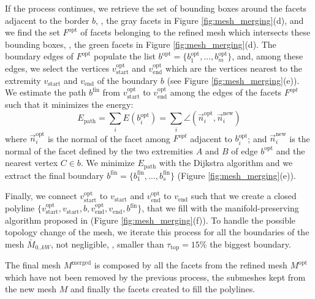 \documentclass[times,10pt,twocolumn]{article}
\begin{document}
If the process continues, we retrieve the set of bounding boxes around the facets adjacent to the border $\mathit{b}$, \ie, the gray facets in Figure \ref{fig:mesh_merging}(d), and we find the set $\mathit{F}^{\text{opt}}$ of facets  belonging to the refined mesh which intersects these bounding boxes, \eg, the green facets  in Figure \ref{fig:mesh_merging}(d).
The boundary edges of $\mathit{F}^{\text{opt}}$ populate the list  $\mathit{b}^{\text{opt}} = \{b_1^{\text{opt}}, \dots,  b_m^{\text{opt}}\}$, and, among these edges, we select the vertices  $v_{\text{start}}^{\text{opt}}$ and $v_{\text{end}}^{\text{opt}}$ which are the vertices nearest to the extremity $v_{\text{start}}$ and  $v_{\text{end}}$ of the boundary $\mathit{b}$ (see Figure \ref{fig:mesh_merging}(e)). 
We estimate the path  $\mathit{b}^{\text{fin}}$ from $v_{\text{start}}^{\text{opt}}$ to $v_{\text{end}}^{\text{opt}}$ among the edges of the facets  $\mathit{F}^{opt}$ such that it minimizes the energy:
\begin{equation}
  E_{\text{path}} = \sum_i E(b_i^{\text{opt}})= \sum_i \angle (\overrightarrow{n}_i^{\text{opt}},\overrightarrow{n}_i^{\text{new}})
\end{equation}
where $\overrightarrow{n}_i^{\text{opt}}$ is the normal of the facet among $\mathit{F}^{opt}$ adjacent to  $b_i^{\text{opt}}$; and
$\overrightarrow{n}_i^{\text{new}}$ is the normal of the facet defined by the two extremities $A$ and $B$ of edge ${b}^{\text{opt}}$ and the nearest vertex $C \in \mathit{b}$.
We minimize $E_{\text{path}}$ with the Dijkstra algorithm  and we extract the final boundary $\mathit{b}^{\text{fin}} = \{ b_1^{\text{fin}}, \dots, b_s^{\text{fin}}\}$ (Figure \ref{fig:mesh_merging}(e)).

Finally, we connect $v_{\text{start}}^{\text{opt}}$ to $v_{\text{start}}$  and $v_{\text{end}}^{\text{opt}}$ to  $v_{\text{end}}$ such that we create a closed polyline $\{v_{\text{start}}^{\text{opt}},  v_{\text{start}}, \mathit{b}, v_{\text{end}}^{\text{opt}}, v_{\text{end}}, \mathit{b}^{\text{fin}}\}$, that we fill with the manifold-preserving algorithm proposed in \cite{liepa2003filling}  (Figure \ref{fig:mesh_merging}(f)). 
To handle the possible topology change of the mesh, we iterate this process for all the boundaries of the mesh  $\mathit{\bar{M}}_{0..kW}$, not negligible, \ie, smaller than $\tau_{\text{top}}= 15\%$ the biggest boundary.

The final mesh $\mathit{M}^{\text{merged}}$ is composed by all the facets from the refined mesh $\mathit{M}^{\text{opt}}$ which have not been removed by the previous process, the submeshes kept from the new mesh $\mathit{M}$ and finally the facets created to fill the polylines.
\end{document}
